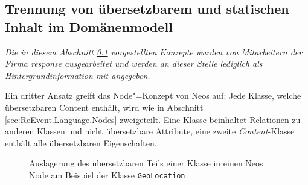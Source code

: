 \subsection{Trennung von übersetzbarem und statischen Inhalt im Domänenmodell}
\label{sec:content.objects}


\begin{center}
\parbox{0.9\textwidth}{
\itshape
\small
Die in diesem Abschnitt \ref{sec:content.objects} vorgestellten Konzepte wurden von Mitarbeitern der Firma response ausgearbeitet und werden an dieser Stelle lediglich als Hintergrundinformation mit angegeben.
}
\end{center}


Ein dritter Ansatz greift das Node"=Konzept von Neos auf: Jede Klasse, welche übersetzbaren Content enthält, wird wie in Abschnitt \ref{sec:ReEvent.Language.Nodes} zweigeteilt. Eine Klasse beinhaltet Relationen zu anderen Klassen und nicht übersetzbare Attribute, eine zweite \emph{Content}-Klasse enthält alle übersetzbaren Eigenschaften.


\begin{figure}[ht!]
\begin{margincap}
\centering
{}
\caption{Auslagerung des übersetzbaren Teils einer Klasse in einen Neos Node am Beispiel der Klasse \texttt{GeoLocation}}
\label{img:AbstractEntityWithContent}
\end{margincap}
\end{figure}

